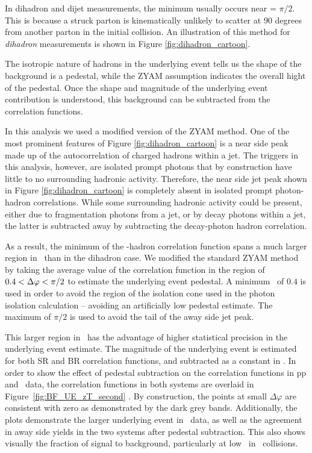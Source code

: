 In dihadron and dijet measurements, the minimum usually occurs near \deltaphi = $\pi/2$. This is because a struck parton is kinematically unlikely to scatter at 90 degrees from another parton in the initial collision. An illustration of this method for \textit{dihadron} measurements is shown in Figure \ref{fig:dihadron_cartoon}.

The isotropic nature of hadrons in the underlying event tells us the shape of the background is a pedestal, while the ZYAM assumption indicates the overall hight of the pedestal. Once the shape and magnitude of the underlying event contribution is understood, this background can be subtracted from the correlation functions. 

In this analysis we used a modified version of the ZYAM method. One of the most prominent features of Figure \ref{fig:dihadron_cartoon} is a near side peak made up of the autocorrelation of charged hadrons within a jet. The triggers in this analysis, however, are isolated prompt photons that by construction have little to no surrounding hadronic activity.  Therefore, the near side jet peak shown in Figure \ref{fig:dihadron_cartoon} is completely absent in isolated prompt photon-hadron correlations. While some surrounding hadronic activity could be present, either due to fragmentation photons from a jet, or by decay photons within a jet, the latter is subtracted away by subtracting the decay-photon hadron correlation.

As a result, the minimum of the \gammaiso-hadron correlation function spans a much larger region in \deltaphi~than in the dihadron case. We modified the standard ZYAM method by taking the average value of the correlation function in the region of $0.4 < \Delta\varphi < \pi/2$ to estimate the underlying event pedestal. A minimum \deltaphi~of $0.4$ is used in order to avoid the region of the isolation cone used in the photon isolation calculation -- avoiding an artificially low pedestal estimate. The maximum of $\pi/2$ is used to avoid the tail of the away side jet peak.

This larger region in \deltaphi~has the advantage of higher statistical precision in the underlying event estimate. The magnitude of the underlying event is estimated for both SR and BR correlation functions, and subtracted as a constant in \deltaphi. In order to show the effect of pedestal subtraction on the correlation functions in pp and \pPb~data, the correlation functions in both systems are overlaid in Figure~\ref{fig:BF_UE_zT_second} . By construction, the points at small $\Delta\varphi$ are consistent with zero as demonstrated by the dark grey bands. Additionally, the plots demonstrate the larger underlying event in \pPb~data, as well as the agreement in away side yields in the two systems after pedestal subtraction. This also shows visually the fraction of signal to background, particularly at low \zt~in \pPb~collisions.


